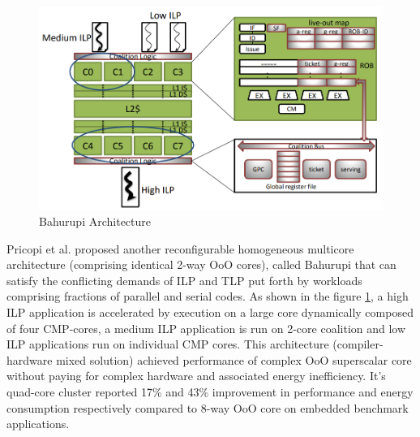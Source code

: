 \documentclass[a4paper,12pt, final]{report}
\begin{document}
\begin{figure}[H]
    \centering
    \includegraphics[width=0.7\linewidth]{bahurupi-architecture.png}
    \caption{Bahurupi Architecture}
    \label{bahurupi-arch}
\end{figure}
\indent Pricopi et al. \cite{pricopi2012bahurupi} proposed another reconfigurable homogeneous multicore architecture (comprising identical 2-way OoO cores), called Bahurupi that can satisfy the conflicting demands of ILP and TLP put forth by workloads comprising fractions of parallel and serial codes. As shown in the figure \ref{bahurupi-arch}, a high ILP application is accelerated by execution on a large core dynamically composed of four CMP-cores, a medium ILP application is run on 2-core coalition and low ILP applications run on individual CMP cores. This architecture (compiler-hardware mixed solution) achieved performance of complex OoO superscalar core without paying for complex hardware and associated energy inefficiency. It's quad-core cluster reported 17\% and 43\% improvement in performance and energy consumption respectively compared to 8-way OoO core on embedded benchmark applications.
\end{document}

